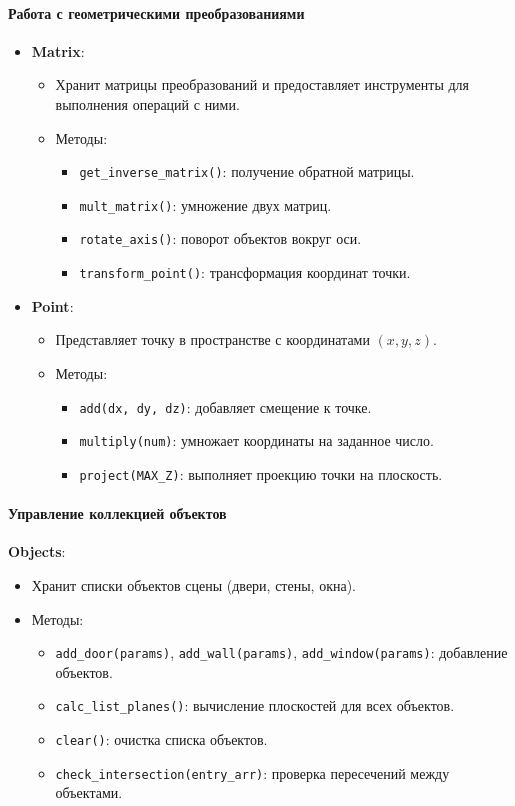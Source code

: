 \paragraph{Работа с геометрическими преобразованиями}
\begin{itemize}
    \item \textbf{Matrix}:
    \begin{itemize}
        \item Хранит матрицы преобразований и предоставляет инструменты для выполнения операций с ними.
        \item Методы:
        \begin{itemize}
            \item \verb|get_inverse_matrix()|: получение обратной матрицы.
            \item \verb|mult_matrix()|: умножение двух матриц.
            \item \verb|rotate_axis()|: поворот объектов вокруг оси.
            \item \verb|transform_point()|: трансформация координат точки.
        \end{itemize}
    \end{itemize}
    \item \textbf{Point}:
    \begin{itemize}
        \item Представляет точку в пространстве с координатами $(x, y, z)$.
        \item Методы:
        \begin{itemize}
            \item \verb|add(dx, dy, dz)|: добавляет смещение к точке.
            \item \verb|multiply(num)|: умножает координаты на заданное число.
            \item \verb|project(MAX_Z)|: выполняет проекцию точки на плоскость.
        \end{itemize}
    \end{itemize}
\end{itemize}

\paragraph{Управление коллекцией объектов}
\textbf{Objects}:
\begin{itemize}
    \item Хранит списки объектов сцены (двери, стены, окна).
    \item Методы:
    \begin{itemize}
        \item \verb|add_door(params)|, \verb|add_wall(params)|, \verb|add_window(params)|: добавление объектов.
        \item \verb|calc_list_planes()|: вычисление плоскостей для всех объектов.
        \item \verb|clear()|: очистка списка объектов.
        \item \verb|check_intersection(entry_arr)|: проверка пересечений между объектами.
    \end{itemize}
\end{itemize}

